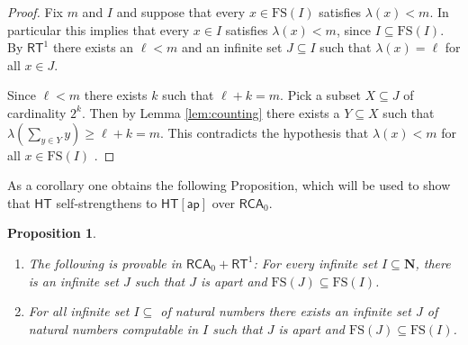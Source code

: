 \documentclass[a4paper,11pt]{article}
\newtheorem{proposition}{Proposition}
\newcommand\Nat{\mathbf{N}}
\newcommand\RCA{\mathsf{RCA}}
\newcommand\HT{\mathsf{HT}}
\newcommand\RT{\mathsf{RT}}
\newcommand\FS{\mathrm{FS}}
\newcommand\ap{\mathsf{ap}}
\begin{document}
\begin{proof}
 Fix $m$ and $I$ and suppose that every $x \in \FS(I)$ satisfies $\lambda(x) < m$. In particular this implies that every $x \in I$ satisfies $\lambda(x) < m$, since $I \subseteq \FS(I)$. By $\RT^1$ there exists an $\ell < m$ 
and an infinite set $J \subseteq I$ such that
$\lambda(x) = \ell$ for all $x \in J$.


Since $\ell < m$ there exists $k$ such that $\ell + k = m$. Pick a subset $X\subseteq J$ of cardinality $2^k$. Then by Lemma \ref{lem:counting} there exists a $Y\subseteq X$ such that
$\lambda(\sum_{y \in Y} y) \geq \ell + k = m$. This contradicts the hypothesis that $\lambda(x) < m$ for all $x \in \FS(I)$ .

\end{proof}

As a corollary one obtains the following Proposition, which will be used to show that $\HT$ self-strengthens to $\HT[\ap]$ over
$\RCA_0$. 


\begin{proposition}\label{prop:self}
\hfill
\begin{enumerate}
\item The following is provable in $\RCA_0 + \RT^1$: For every infinite set $I\subseteq\Nat$, there is an infinite set $J$ such that $J$ is apart and $\FS(J) \subseteq \FS(I)$. 
\item For all infinite set $I\subseteq$ of natural numbers there exists an infinite set $J$ of natural numbers computable in $I$ such that $J$ is apart and $\FS(J)\subseteq \FS(I)$. 
\end{enumerate}
\end{proposition}
\end{document}
